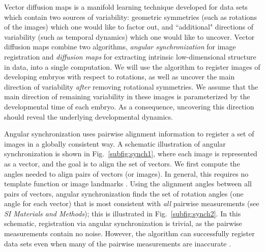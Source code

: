 \documentclass{pnastwo}
\newcommand{\SI}[0]{{\it SI Materials and Methods}}
\newcommand{\fig}[0]{Fig.}
\begin{document}
\begin{article}
Vector diffusion maps \cite{singer2012vector} is a manifold learning
technique developed for data sets which contain two sources of variability:
geometric symmetries (such as rotations of the images) which one would like to factor out,
and ``additional" directions of variability (such as temporal dynamics) which one would like to uncover.
%
Vector diffusion maps combine two algorithms, {\em angular synchronization} \cite{singer2011angular} for image registration and {\em diffusion maps} \cite{coifman2005geometric} for extracting intrinsic low-dimensional structure in data, into a single computation.
%
We will use the algorithm to register images of developing embryos with respect to rotations, as well as uncover the main direction of variability {\it after} removing rotational symmetries.
%
We assume that the main direction of remaining variability in these images is parameterized by the developmental time of each embryo.
%
As a consequence, uncovering this direction should reveal the underlying developmental dynamics.

Angular synchronization uses pairwise alignment information to register a set of images in a globally consistent way.
%
A schematic illustration of angular synchronization is shown in \fig~\ref{subfig:synch1}, where each image is represented as a vector, and the goal is to align the set of vectors.
%
We first compute the angles needed to align pairs of vectors (or images).  
%
In general, this requires no template function \cite{ahuja2007template} or image landmarks \cite{ian1998statistical}.
%
Using the alignment angles between all pairs of vectors, angular synchronization finds the set of rotation angles (one angle for each vector) that is most consistent with {\it all} pairwise measurements (see \SI); this is illustrated in \fig~\ref{subfig:synch2}.
%
In this schematic, registration via angular synchronization is trivial, as the pairwise measurements contain no noise.
%
However, the algorithm can successfully register data sets even when many of the pairwise measurements are inaccurate \cite{singer2011angular}.


\end{article}
\end{document}
